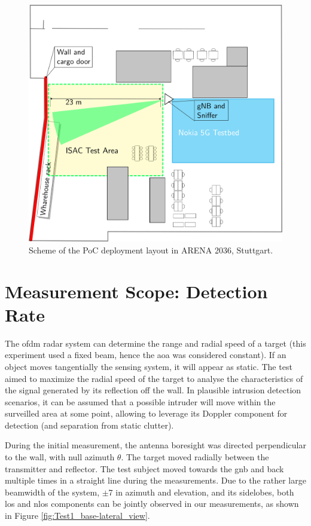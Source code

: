 \begin{figure}[H]
	\centering
	\includegraphics[width=.6\textwidth]{Images/Test1/arena_plan}
	\caption{\small Scheme of the PoC deployment layout in ARENA 2036, Stuttgart.}
	\label{fig:Test1_arena_plan}
\end{figure}


\section{Measurement Scope: Detection Rate}

The \gls{ofdm} radar system can determine the range and radial speed of a target (this experiment used a fixed beam, hence the \gls{aoa} was considered constant). If an object moves tangentially \wrt the sensing system, it will appear as static.
The test aimed to maximize the radial speed of the target to analyse the characteristics of the signal generated by its reflection off the wall.
In plausible intrusion detection scenarios, it can be assumed that a possible intruder will move within the surveilled area at some point, allowing to leverage its Doppler component for detection (and separation from static clutter).

During the initial measurement, the antenna boresight was directed perpendicular to the wall, with null azimuth $\theta$.
The target moved radially between the transmitter and reflector. The test subject moved towards the \gls{gnb} and back multiple times in a straight line during the measurements.
Due to the rather large beamwidth of the system, $\pm$7\textdegree\hspace{1pt} in azimuth and elevation, and its sidelobes, both \gls{los} and \gls{nlos} components can be jointly observed in our measurements, as shown in Figure \ref{fig:Test1_base-lateral_view}.


